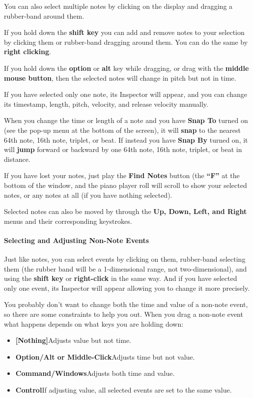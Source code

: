 \documentclass[twoside,10pt]{article}
\begin{document}
You can also select multiple notes by clicking on the display and dragging a rubber-band around them.  

If you hold down the {\bf shift key} you can add and remove notes to your selection by clicking them or rubber-band dragging around them.  You can do the same by {\bf right clicking}.

If you hold down the {\bf option} or {\bf alt} key while dragging, or drag with the {\bf middle mouse button}, then the selected notes will change in pitch but not in time.

If you have selected only one note, its Inspector will appear, and you can change its timestamp, length, pitch, velocity, and release velocity manually.

When you change the time or length of a note and you have {\bf Snap To} turned on (see the pop-up menu at the bottom of the screen), it will {\bf snap} to the nearest 64th note, 16th note, triplet, or beat.  If instead you have {\bf Snap By} turned on, it will {\bf jump} forward or backward by one 64th note, 16th note, triplet, or beat in distance.

If you have lost your notes, just play the {\bf Find Notes} button (the {\bf ``F''} at the bottom of the window, and the piano player roll will scroll to show your selected notes, or any notes at all (if you have nothing selected).

Selected notes can also be moved by through the {\bf Up, Down, Left, and Right} menus and their corresponding keystrokes. 

\paragraph{Selecting and Adjusting Non-Note Events}

Just like notes, you can select events by clicking on them, rubber-band selecting them (the rubber band will be a 1-dimensional range, not two-dimensional), and using the {\bf shift key} or {\bf right-click} in the same way.  And if you have selected only one event, its Inspector will appear allowing you to change it more precisely.

You probably don't want to change both the time and value of a non-note event, so there are some constraints to help you out.  When you drag a non-note event what happens depends on what keys you are holding down:

\begin{itemize}
\item {\bf [Nothing]}\qquad Adjusts value but not time.
\item {\bf Option/Alt or Middle-Click}\qquad Adjusts time but not value.
\item {\bf Command/Windows}\qquad Adjusts both time and value.
\item {\bf Control}\qquad If adjusting value, all selected events are set to the same value.
\end{itemize}        
\end{document}
